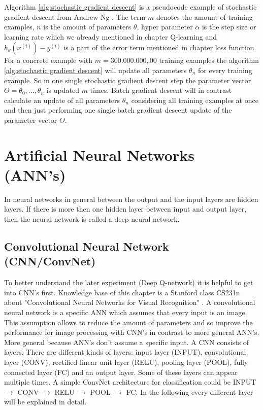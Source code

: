 \documentclass[conference]{IEEEtran}
\begin{document}
Algorithm \ref{alg:stochastic gradient descent} is a pseudocode example of stochastic gradient descent from Andrew Ng \cite{ng_2017}. The term $m$ denotes the amount of training examples, $n$ is the amount of parameters $\theta$, hyper parameter $\alpha$ is the step size or learning rate which we already mentioned in chapter Q-learning and $h_\theta(x^{(i)}) - y^{(i)}$ is a part of the error term mentioned in chapter loss function. For a concrete example with $m = 300.000.000,00$ training examples the algorithm \ref{alg:stochastic gradient descent} will update all parameters $\theta_n$ for every training example. So in one single stochastic gradient descent step the parameter vector $\Theta = \theta_0, ..., \theta_n$ is updated $m$ times. Batch gradient descent will in contrast calculate an update of all parameters $\theta_n$ considering all training examples at once and then just performing one single batch gradient descent update of the parameter vector $\Theta$.

\section{Artificial Neural Networks (ANN's)}
In neural networks in general between the output and the input layers are hidden layers. If there is more then one hidden layer between input and output layer, then the neural network is called a deep neural network.

\subsection{Convolutional Neural Network (CNN/ConvNet)}

To better understand the later experiment \cite{mnih-atari-2013} (Deep Q-network) it is helpful to get into CNN's first. Knowledge base of this chapter is a Stanford class CS231n about "Convolutional Neural Networks for Visual Recognition" \cite{KarpathyCNN}. A convolutional neural network is a specific ANN which assumes that every input is an image. This assumption allows to reduce the amount of parameters and so improve the performance for image processing with CNN's in contrast to more general ANN's. More general because ANN's don't assume a specific input. A CNN consists of layers. There are different kinds of layers: input layer (INPUT), convolutional layer (CONV), rectified linear unit layer (RELU), pooling layer (POOL), fully connected layer (FC) and an output layer. Some of these layers can appear multiple times. A simple ConvNet architecture for classification could be INPUT $\rightarrow$ CONV $\rightarrow$ RELU $\rightarrow$ POOL $\rightarrow$ FC. In the following every different layer will be explained in detail.
\end{document}
